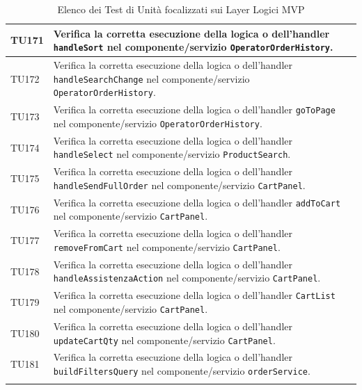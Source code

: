\documentclass[a4paper,11pt,oneside]{scrartcl}
\begin{document}
\begin{longtable}{|p{1.9cm}|p{11.6cm}|c|}
    TU171           & Verifica la corretta esecuzione della logica o dell'handler \texttt{handleSort} nel componente/servizio \texttt{OperatorOrderHistory}.                       &                \\ \hline
    TU172           & Verifica la corretta esecuzione della logica o dell'handler \texttt{handleSearchChange} nel componente/servizio \texttt{OperatorOrderHistory}.               &                \\ \hline
    TU173           & Verifica la corretta esecuzione della logica o dell'handler \texttt{goToPage} nel componente/servizio \texttt{OperatorOrderHistory}.                         &                \\ \hline
    TU174           & Verifica la corretta esecuzione della logica o dell'handler \texttt{handleSelect} nel componente/servizio \texttt{ProductSearch}.                            &                \\ \hline
    TU175           & Verifica la corretta esecuzione della logica o dell'handler \texttt{handleSendFullOrder} nel componente/servizio \texttt{CartPanel}.                         &                \\ \hline
    TU176           & Verifica la corretta esecuzione della logica o dell'handler \texttt{addToCart} nel componente/servizio \texttt{CartPanel}.                                   &                \\ \hline
    TU177           & Verifica la corretta esecuzione della logica o dell'handler \texttt{removeFromCart} nel componente/servizio \texttt{CartPanel}.                              &                \\ \hline
    TU178           & Verifica la corretta esecuzione della logica o dell'handler \texttt{handleAssistenzaAction} nel componente/servizio \texttt{CartPanel}.                      &                \\ \hline
    TU179           & Verifica la corretta esecuzione della logica o dell'handler \texttt{CartList} nel componente/servizio \texttt{CartPanel}.                                    &                \\ \hline
    TU180           & Verifica la corretta esecuzione della logica o dell'handler \texttt{updateCartQty} nel componente/servizio \texttt{CartPanel}.                               &                \\ \hline
    TU181           & Verifica la corretta esecuzione della logica o dell'handler \texttt{buildFiltersQuery} nel componente/servizio \texttt{orderService}.                        &                \\ \hline
    \caption{Elenco dei Test di Unità focalizzati sui Layer Logici MVP}
\end{longtable}
\end{document}

